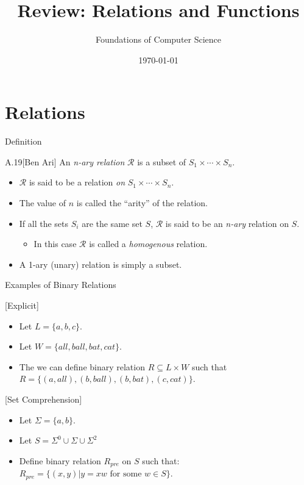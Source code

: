 \documentclass[style=sailor,size=12pt]{powerdot}
\title{Review: Relations and Functions}
\author{Foundations of Computer Science}
\date{\today}
\begin{document}
\maketitle
\section[slide=true]{Relations}
\begin{slide}[bm=,toc=]{Definition}
\begin{defn}{A.19}[Ben Ari]
An \emph{n-ary relation} $\mathcal{R}$ is a subset of $S_1 \times \cdots \times
S_n$. 
\begin{itemize}
\item $\mathcal{R}$ is said to be a relation \emph{on} $S_1 \times \cdots \times
S_n$.
\item The value of $n$ is called the ``arity'' of the relation.
\item If all the sets $S_i$ are the same set $S$, $\mathcal{R}$ is said to be
an \emph{n-ary} relation on $S$.
\begin{itemize}
\item In this case $\mathcal{R}$ is called a \emph{homogenous} relation.
\end{itemize}
\item A 1-ary (unary) relation is simply a subset.
\end{itemize}
\end{defn}
\end{slide}

\begin{slide}[bm=,toc=]{Examples of Binary Relations}
\begin{ex}{}[Explicit]~\\
\begin{itemize}
\item Let $L = \{a,b,c\}$.
\item Let $W = \{all,ball,bat,cat\}$.
\item The we can define binary relation $R \subseteq L \times W$ such that 
      $R = \{(a,all),(b,ball),(b, bat), (c,cat)\}$.
\end{itemize}
\end{ex}
\begin{ex}{}[Set Comprehension]~\\
\begin{itemize}
\item Let $\Sigma = \{a,b\}$.
\item Let $S = \Sigma^0 \cup \Sigma \cup \Sigma^2$
\item Define binary relation $R_{pre}$ on $S$ such that:
      $R_{pre} = \{(x,y)| y = xw \text{ for some } w \in S \}$.
\end{itemize}
\end{ex}

\end{slide}
\end{document}
